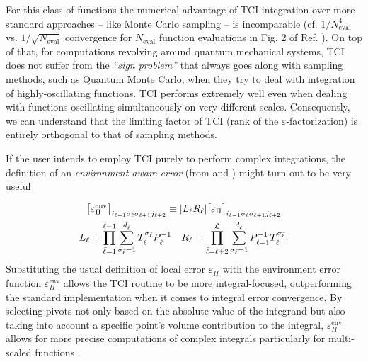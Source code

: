 For this class of functions the numerical advantage of TCI integration over more standard approaches -- like Monte Carlo sampling -- is incomparable (cf. $1/N_{\text{eval}}^4$ vs. $1/\sqrt{N_{\text{eval}}}$ convergence for $N_{\text{eval}}$ function evaluations in Fig. 2 of Ref. \cite{Fernandez2024}). On top of that, for computations revolving around quantum mechanical systems, TCI does not suffer from the \textit{``sign problem''} \cite{Loh1990} that always goes along with sampling methods, such as Quantum Monte Carlo, when they try to deal with integration of highly-oscillating functions. TCI performs extremely well even when dealing with functions oscillating simultaneously on very different scales. Consequently, we can understand that the limiting factor of TCI (rank of the $\varepsilon$-factorization) is entirely orthogonal
to that of sampling methods.

If the user intends to employ TCI purely to perform complex integrations, the definition of an \textit{environment-aware error} (from  and ) might turn out to be very useful

\begin{gather}
	\nonumber\bigl[\varepsilon^{\text{env}}_\Pi\bigr]_{i_{\ell-1}\sigma_\ell \sigma_{\ell +1} j_{\ell +2 }}\equiv |L_\ell R_\ell| \bigl[\varepsilon_\Pi\bigr]_{i_{\ell-1}\sigma_\ell \sigma_{\ell +1} j_{\ell +2 }} \\
	L_\ell = \prod_{\bar{\ell}=1}^{\ell -1} \sum^{d_{\bar{\ell}}}_{\sigma_{\bar{\ell}} = 1} T^{\sigma_{\bar{\ell}}}_{\bar{\ell}} P^{-1}_{\bar{\ell}} \quad R_\ell = \prod_{\bar{\ell}=\ell +2}^{\mathcal{L}} \sum^{d_{\bar{\ell}}}_{\sigma_{\bar{\ell}} = 1}  P^{-1}_{\bar{\ell}-1}T^{\sigma_{\bar{\ell}}}_{\bar{\ell}}.
	\label{eq:envError}
\end{gather}
Substituting the usual definition of local  error $\varepsilon_\Pi$ with the environment error function $\varepsilon^{\text{env}}_\Pi$ allows the TCI routine to be more integral-focused, outperforming the standard implementation when it comes to integral error convergence. By selecting pivots not only based on the absolute value of the integrand but also taking into account a specific point's volume contribution to the integral,  $\varepsilon^{\text{env}}_\Pi$ allows for more precise computations of complex integrals particularly for multi-scaled functions \cite{Fernandez2022}.   

